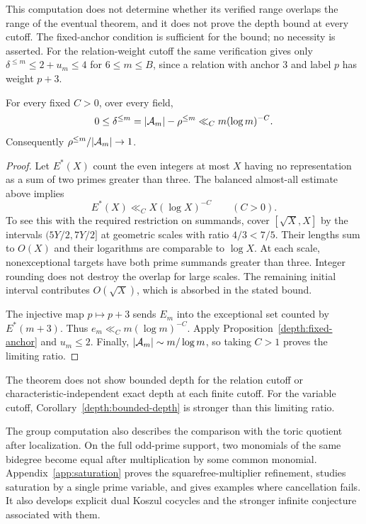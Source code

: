 This computation does not determine whether its verified range
overlaps the range of the eventual theorem, and it does not prove
the depth bound at every cutoff. The fixed-anchor condition is
sufficient for the bound; no necessity is asserted. For the
relation-weight cutoff the same verification gives only
$\delta^{\le m}\le2+u_m\le4$ for $6\le m\le B$, since a relation
with anchor $3$ and label $p$ has weight $p+3$.

\begin{theorem}\label{depth:relation-cutoff-pd}
For every fixed $C>0$, over every field,
\[
 0\le\delta^{\le m}
   =|\mathcal A_m|-\rho^{\le m}
   \ll_C m(\log m)^{-C}.
\]
Consequently $\rho^{\le m}/|\mathcal A_m|\to1$.
\end{theorem}
\begin{proof}
Let $E^*(X)$ count the even integers at most $X$ having no representation
as a sum of two primes greater than three. The balanced almost-all
estimate above implies
\[
 E^*(X)\ll_C X(\log X)^{-C}\qquad(C>0).
\]
To see this with the required restriction on summands, cover
$[\sqrt X,X]$ by the intervals $(5Y/2,7Y/2]$ at geometric scales
with ratio $4/3<7/5$. Their lengths sum to $O(X)$ and their logarithms
are comparable to $\log X$. At each scale, nonexceptional targets
have both prime summands greater than three. Integer rounding does not
destroy the overlap for large scales. The remaining initial interval
contributes $O(\sqrt X)$, which is absorbed in the stated bound.

The injective map $p\mapsto p+3$ sends $E_m$ into the exceptional set
counted by $E^*(m+3)$. Thus $e_m\ll_C m(\log m)^{-C}$. Apply
Proposition~\ref{depth:fixed-anchor} and $u_m\le2$. Finally,
$|\mathcal A_m|\sim m/\log m$, so taking $C>1$ proves the limiting ratio.
\end{proof}

The theorem does not show bounded depth for the relation cutoff or
characteristic-independent exact depth at each finite cutoff. For the
variable cutoff, Corollary~\ref{depth:bounded-depth} is stronger than
this limiting ratio.


The group computation also describes the comparison with the toric
quotient after localization. On the full odd-prime support, two
monomials of the same bidegree become equal after multiplication by
some common monomial. Appendix~\ref{app:saturation} proves the
squarefree-multiplier refinement, studies saturation by a single
prime variable, and gives examples where cancellation fails. It also
develops explicit dual Koszul cocycles and the stronger infinite
conjecture associated with them.
